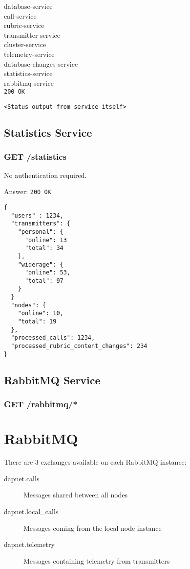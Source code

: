 database-service\\
call-service\\
rubric-service\\
transmitter-service\\
cluster-service\\
telemetry-service\\
database-changes-service\\
statistics-service\\
rabbitmq-service\\


\texttt{200 OK}
\begin{lstlisting}
<Status output from service itself>
\end{lstlisting}


\subsection{Statistics Service}

\subsubsection{GET /statistics}
No authentication required.

Answer:
\texttt{200 OK}
\begin{lstlisting}
{
  "users" : 1234,
  "transmitters": {
    "personal": {
      "online": 13
      "total": 34
    },
    "widerage": {
      "online": 53,
      "total": 97
    }
  }
  "nodes": {
    "online": 10,
    "total": 19
  },
  "processed_calls": 1234,
  "processed_rubric_content_changes": 234
}
\end{lstlisting}


\subsection{RabbitMQ Service}

\subsubsection{GET /rabbitmq/*}


\section{RabbitMQ}
\label{protocoldef:RabbitMQ}
There are 3 exchanges available on each RabbitMQ instance:
\begin{description}
\item[dapnet.calls] Messages shared between all nodes
\item[dapnet.local\_calls] Messages coming from the local node instance
\item[dapnet.telemetry] Messages containing telemetry from transmitters
\end{description}


